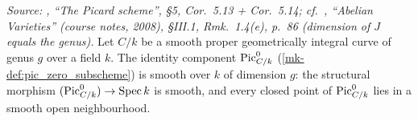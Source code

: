 \begin{theorem}
  \label{mk-thm:pic0_smooth}

  \textit{Source: \cite{kleiman-picard}, ``The Picard scheme'', \S 5,
  Cor.~5.13 + Cor.~5.14; cf.\ \cite{milne-av}, ``Abelian Varieties''
  (course notes, 2008), \S III.1, Rmk.~1.4(e), p.~86 (dimension of \(J\)
  equals the genus).}
  Let \(C/k\) be a smooth proper geometrically integral curve of genus
  \(g\) over a field \(k\). The identity component \(\operatorname{Pic}^0_{C/k}\)
  (\ref{mk-def:pic_zero_subscheme}) is smooth over \(k\) of dimension
  \(g\): the structural morphism
  \((\operatorname{Pic}^0_{C/k}) \to \operatorname{Spec} k\) is smooth, and every closed point of
  \(\operatorname{Pic}^0_{C/k}\) lies in a smooth open neighbourhood.
\end{theorem}
